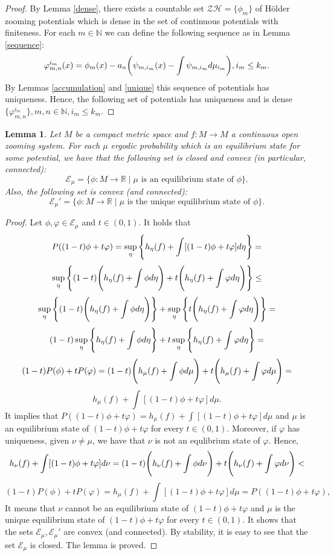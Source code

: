 \documentclass[12pt,a4paper]{amsart}
\theoremstyle{plain}
\newtheorem{lemma}{Lemma}[subsection]
\begin{document}
\begin{proof}
	By Lemma \ref{dense}, there exists a countable set $\mathcal{ZH} = \{\phi_{m}\}$ of H\"older zooming potentials which is dense in the set of continuous potentials with finiteness. For each $m \in \mathbb{N}$ we can define the following sequence as in Lemma \ref{sequence}:
	\[
	\varphi_{m,n}^{i_{m}}(x) = \phi_{m}(x) - a_{n}\bigg{(}\psi_{m,i_{m}}(x) - \int \psi_{m,i_{m}} d\mu_{i_{m}}\bigg{)}, i_{m} \leq k_{m}.
	\]
	By Lemmas \ref{accumulation} and \ref{unique} this sequence of potentials has uniqueness. Hence, the following set of potentials has uniqueness and is dense $\{\varphi_{m,n}^{i_{m}}\}, m,n \in \mathbb{N}, i_{m} \leq k_{m}$.	
\end{proof}
\begin{lemma}\label{convex}
	Let $M$ be a compact metric space and $f: M \to M$ a continuous open zooming system. For each $\mu$ ergodic probability which is an equilibrium state for some potential, we have that the following set is closed and convex (in particular, connected):
	\[
	\mathcal{E}_{\mu} = \{\phi: M \to \mathbb{R} \mid \mu \,\, \text{is an equilibrium state of} \,\, \phi\}.
	\]
	Also, the following set is convex (and connected):
	\[
	\mathcal{E}_{\mu}' = \{\phi: M \to \mathbb{R} \mid \mu \,\, \text{is the unique equilibrium state of} \,\, \phi\}.
	\]
\end{lemma} 
\begin{proof}
	Let $\phi, \varphi \in \mathcal{E}_{\mu}$ and $t \in (0,1)$. It holds that
	\[
	P((1-t)\phi + t\varphi) = \sup_{\eta}\Bigg{\{} h_{\eta}(f) + \int[(1-t)\phi + t\varphi] d\eta\Bigg{\}} =
	\]
	\[
	\sup_{\eta}\Bigg{\{}(1-t) \Bigg{(}h_{\eta}(f) + \int \phi d\eta\Bigg{)}+ t\Bigg{(}h_{\eta}(f) + \int \varphi d\eta \Bigg{)}\Bigg{\}} \leq
	\]
	\[
	\sup_{\eta}\Bigg{\{}(1-t) \Bigg{(}h_{\eta}(f) + \int \phi d\eta\Bigg{)}\Bigg{\}} + 
	\sup_{\eta}\Bigg{\{} t\Bigg{(}h_{\eta}(f) + \int \varphi d\eta \Bigg{)}\Bigg{\}} =
	\]
	\[
	(1-t)\sup_{\eta}\Bigg{\{}h_{\eta}(f) + \int \phi d\eta\Bigg{\}} + 
	t\sup_{\eta}\Bigg{\{}h_{\eta}(f) + \int \varphi d\eta\Bigg{\}} =
	\]
	\[
	(1-t)P(\phi) + tP(\varphi) = (1-t)\Bigg{(}h_{\mu}(f) + \int \phi d\mu \Bigg{)} + t\Bigg{(}h_{\mu}(f) + \int \varphi d\mu \Bigg{)}=
	\]
	\[
	h_{\mu}(f) + \int [(1-t)\phi + t\varphi] d\mu.
	\]
	It implies that $P((1-t)\phi + t\varphi) = h_{\mu}(f) + \int [(1-t)\phi + t\varphi] d\mu$ and $\mu$ is an equilibrium state of $(1-t)\phi + t\varphi$ for every $t \in (0,1)$. Moreover, if $\varphi$ has uniqueness, given $\nu \neq \mu$, we have that $\nu$ is not an equlibrium state of $\varphi$. Hence,
	\[
	h_{\nu}(f) + \int [(1-t)\phi + t\varphi] d\nu = (1-t)\Bigg{(}h_{\nu}(f) + \int \phi d\nu \Bigg{)} + t\Bigg{(}h_{\nu}(f) + \int \varphi d\nu \Bigg{)} <
	\]
	\[
	(1-t)P(\phi) + tP(\varphi) = h_{\mu}(f) + \int [(1-t)\phi + t\varphi] d\mu = P((1-t)\phi + t\varphi),
	\] 
	It means that $\nu$ cannot be an equilibrium state of $(1-t)\phi + t\varphi$ and $\mu$ is the unique equilibrium state of $(1-t)\phi + t\varphi$ for every $t \in (0,1)$. It shows that the sets $\mathcal{E}_{\mu}, \mathcal{E}_{\mu}'$ are convex (and connected). By stability, it is easy to see that the set $\mathcal{E}_{\mu}$ is closed. The lemma is proved.
\end{proof} 
\end{document}
